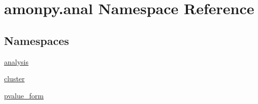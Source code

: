 \hypertarget{namespaceamonpy_1_1anal}{\section{amonpy.\-anal Namespace Reference}
\label{namespaceamonpy_1_1anal}
}
\subsection*{Namespaces}
\begin{DoxyCompactItemize}
\item 
\hyperlink{namespaceamonpy_1_1anal_1_1analysis}{analysis}
\item 
\hyperlink{namespaceamonpy_1_1anal_1_1cluster}{cluster}
\item 
\hyperlink{namespaceamonpy_1_1anal_1_1pvalue__form}{pvalue\-\_\-form}
\end{DoxyCompactItemize}
